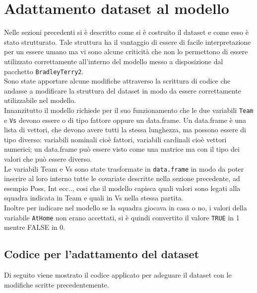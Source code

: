 \section{Adattamento dataset al modello}

Nelle sezioni precedenti si è descritto come si è costruito il dataset e come esso è stato strutturato. Tale struttura ha il vantaggio di essere di facile interpretazione per un essere umano ma vi sono alcune criticità che non lo permettono di essere utilizzato correttamente all'interno del modello messo a disposizione dal pacchetto \texttt{BradleyTerry2}.\\ 
Sono state apportare alcune modifiche attraverso la scrittura di codice che andasse a modificare la struttura del dataset in modo da essere correttamente utilizzabile nel modello. \\

Innanzitutto il modello richiede per il suo funzionamento che le due variabili \texttt{Team} e \texttt{Vs} devono essere o di tipo fattore oppure un \textsf{data.frame}. Un \textsf{data.frame} è una lista di vettori, che devono avere tutti la stessa lunghezza, ma possono essere di tipo diverso: variabili nominali cioè fattori, variabili cardinali cioè vettori numerici; un \textsf{data.frame} può essere visto come una matrice ma con il tipo dei valori che può essere diverso.\\ 
Le variabili \textsf{Team} e \textsf{Vs} sono state trasformate in \texttt{data.frame} in modo da poter inserire al loro interno tutte le covariate descritte nella sezione precedente, ad esempio \textsf{Poss}, \textsf{Int} ecc.., cosi che il modello capisca quali valori sono legati alla squadra indicata in \textsf{Team} e quali in \textsf{Vs} nella stessa partita.\\

Inoltre per indicare nel modello se la squadra giocava in casa o no, i valori della variabile \texttt{AtHome} non erano accettati, si è quindi convertito il valore \texttt{TRUE} in 1 mentre FALSE in 0.



\subsection{Codice per l'adattamento del dataset}
Di seguito viene mostrato il codice applicato per adeguare il dataset con le modifiche scritte precedentemente.

